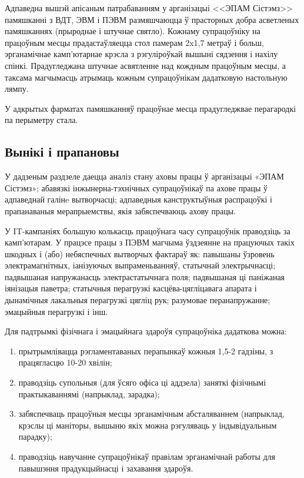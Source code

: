 Адпаведна вышэй апісаным патрабаванням у арганізацыі <<ЭПАМ Сістэмз>> памяшканні з ВДТ, ЭВМ і ПЭВМ размяшчаюцца ў прасторных добра асветленых памяшканнях 
(прыроднае і штучнае святло). Кожнаму супрацоўніку на працоўным месцы
прадастаўляецца стол памерам 2x1,7 метраў і больш, эрганамічнае камп'ютарнае крэсла з рэгуліроўкай вышыні сядзення і нахілу спінкі. Прадугледжана
штучнае асвятленне над кождным працоўным месцы, а таксама магчымасць атрымаць кожным супрацоўнікам дадатковую настольную лямпу.

У адкрытых фарматах памяшканняў працоўнае месца прадугледжвае
перагародкі па перыметру стала.

\subsection{Вынікі і прапановы}

У дадзеным раздзеле даецца аналіз стану аховы працы ў арганізацыі «ЭПАМ Сістэмз»; абавязкі інжынерна-тэхнічных супрацоўнікаў па ахове працы ў адпаведнай галінe вытворчасці; адпаведныя канструктыўныя распрацоўкі і прапанаваныя мерапрыемствы, якія забяспечваюць ахову працы.

У IT-кампаніях большую колькасць працоўнага часу супрацоўнік праводзіць за кам\-п'ю\-та\-рам. У працэсе працы з ПЭВМ магчыма ўздзеянне на працуючых такіх шкодных і (або) небяспечных вытворчых фактараў як: павышаны ўзровень электрамагнітных, іанізуючых выпраменьванняў, статычнай электрычнасці; падвышаная напружанасць электрастатычнага поля; падвышаная ці паніжаная іянізацыя паветра; статычныя перагрузкі касцёва-цягліцавага апарата і дынамічныя лакальныя перагрузкі цягліц рук; разумовае перанапружанне; эмацыйныя перагрузкі і інш.

Для падтрымкі фізічнага і эмацыйнага здароўя супрацоўніка дадаткова можна:
\begin{enumerate}
    \item прытрымлівацца рэгламентаваных перапынкаў кожныя 1,5-2 гадзіны, з працягласцю 10-20 хвілін;
    \item праводзіць супольныя (для ўсяго офіса ці аддзела) заняткі фізічнымі практыкаваннямі (напрыклад, зарадка);
    \item забяспечваць працоўныя месцы эрганамічным абсталяваннем (напрыклад, крэслы ці маніторы, вышыню якіх можна рэгуляваць у індывідуальным парадку);
    \item праводзіць навучанне супрацоўнікаў правілам эрганамічнай работы для павышэння прадукцыйнасці і захавання здароўя.
\end{enumerate}
